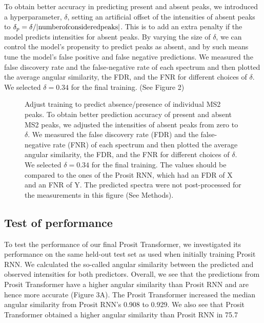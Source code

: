 \documentclass[10pt,a4paper]{article}
\begin{document}
To obtain better accuracy in predicting present and absent peaks, we introduced a hyperparameter, $\delta$, setting an artificial offset of the intensities of absent peaks to $\delta_p =\delta / |\rm{number of considered peaks}|$. This is to add an extra penalty if the model predicts intensities for absent peaks. By varying the size of $\delta$, we can control the model’s propensity to predict peaks as absent, and by such means tune the model’s false positive and false negative predictions. We measured the false discovery rate and the false-negative rate of each spectrum and then plotted the average angular similarity, the FDR, and the FNR for different choices of $\delta$. We selected $\delta=0.34$ for the final training. (See Figure 2)


\begin{figure}[htb]
\caption{
Adjust training to predict absence/presence of individual MS2 peaks. To obtain better prediction accuracy of present and absent MS2 peaks, we adjusted the intensities of absent peaks from zero to $\delta$. We measured the false discovery rate (FDR) and the false-negative rate (FNR) of each spectrum and then plotted the average angular similarity, the FDR, and the FNR for different choices of $\delta$. We selected $\delta=0.34$ for the final training.  The values should be compared to the ones of the Prosit RNN, which had an FDR of X and an FNR of Y. The predicted spectra were not post-processed for the measurements in this figure (See Methods).}
\end{figure}


\subsection*{Test of performance}

To test the performance of our final Prosit Transformer, we investigated its performance on the same held-out test set as used when initially training Prosit RNN. We calculated the so-called angular similarity between the predicted and observed intensities for both predictors. Overall, we see that the predictions from Prosit Transformer have a higher angular similarity than Prosit RNN and are hence more accurate (Figure 3A). The Prosit Transformer increased the median angular similarity from Prosit RNN’s 0.908 to 0.929. We also see that Prosit Transformer obtained a higher angular similarity than Prosit RNN in 75.7%
\end{document}
